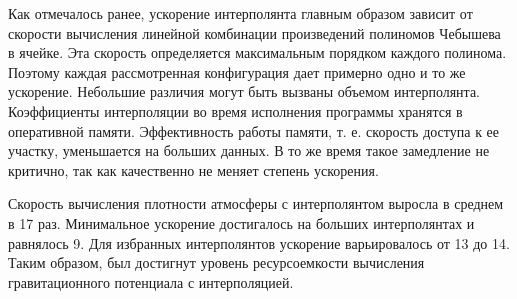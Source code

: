  Как отмечалось ранее, ускорение интерполянта главным образом зависит от скорости
 вычисления линейной комбинации произведений полиномов Чебышева в ячейке. 
 Эта скорость определяется максимальным порядком каждого полинома. Поэтому каждая
 рассмотренная конфигурация дает примерно одно и то же ускорение. Небольшие различия
 могут быть вызваны объемом интерполянта. Коэффициенты интерполяции во время исполнения
 программы хранятся в оперативной памяти. Эффективность работы памяти, 
 т. е. скорость доступа к ее участку, уменьшается на больших данных. В то же время
 такое замедление не критично, так как качественно не меняет степень ускорения.

 Скорость вычисления плотности атмосферы с интерполянтом выросла в среднем в 17 раз.
 Минимальное ускорение достигалось на больших интерполянтах и равнялось 9. Для избранных
 интерполянтов ускорение варьировалось от 13 до 14. Таким образом, был достигнут
 уровень ресурсоемкости вычисления гравитационного потенциала с интерполяцией.

